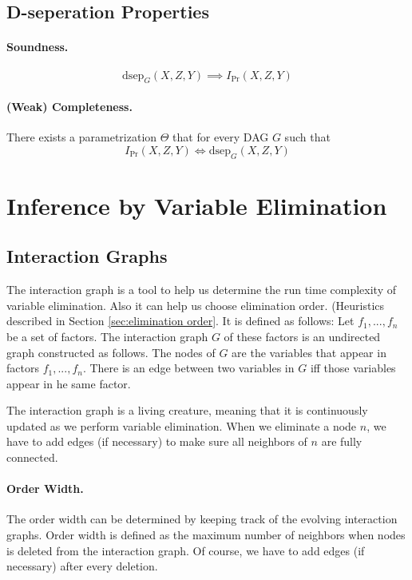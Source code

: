 \documentclass[11pt]{article}
\newcommand{\pr}{\mathrm{Pr}}
\newcommand{\dsep}{\mathrm{dsep}}
\begin{document}
\subsection{D-seperation Properties}
\paragraph{Soundness.} 
\begin{equation}
	\dsep_ G ( X, Z, Y ) \implies I _\pr (X, Z, Y)
\end{equation}

\paragraph{(Weak) Completeness.}
There exists a parametrization $\Theta$ that for every DAG $G$ such that
\begin{equation}
	I_\pr (X, Z, Y) \iff \dsep_G (X, Z, Y)
\end{equation}

\section{Inference by Variable Elimination}
\subsection{Interaction Graphs}
The interaction graph is a tool to help us determine the run time complexity of variable elimination. Also it can help us choose elimination order. (Heuristics described in Section \ref{sec:elimination order}. It is defined as follows: Let $f_1, ..., f_n$ be a set of factors. The interaction graph $G$ of these factors is an undirected graph constructed as follows. The nodes of $G$ are the variables that appear in factors $f_1, ..., f_n$. There is an edge between two variables in $G$ iff those variables appear in he same factor. 

The interaction graph is a living creature, meaning that it is continuously updated as we perform variable elimination. When we eliminate a node $n$, we have to add edges (if necessary) to make sure all neighbors of $n$ are fully connected. 

\paragraph{Order Width.} The order width can be determined by keeping track of the evolving interaction graphs. Order width is defined as the maximum number of neighbors when nodes is deleted from the interaction graph. Of course, we have to add edges (if necessary) after every deletion.
\end{document}
